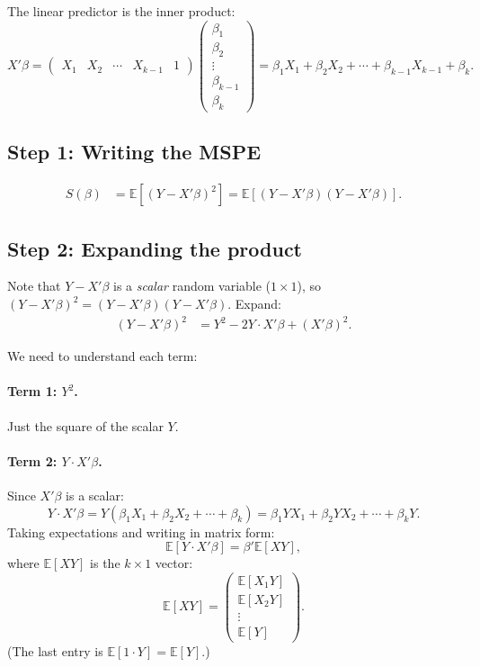 \documentclass[12pt]{article}
\newcommand{\E}{\mathbb{E}}
\theoremstyle{definition}
\begin{document}
The linear predictor is the inner product:
\[
X'\beta = \begin{pmatrix} X_1 & X_2 & \cdots & X_{k-1} & 1 \end{pmatrix}
\begin{pmatrix} \beta_1 \\ \beta_2 \\ \vdots \\ \beta_{k-1} \\ \beta_k \end{pmatrix}
= \beta_1 X_1 + \beta_2 X_2 + \cdots + \beta_{k-1} X_{k-1} + \beta_k.
\]

\subsection{Step 1: Writing the MSPE}

\begin{align}
S(\beta) &= \E\!\left[(Y - X'\beta)^2\right] = \E\!\left[(Y - X'\beta)(Y - X'\beta)\right]. \label{eq:Sbeta}
\end{align}

\subsection{Step 2: Expanding the product}

Note that $Y - X'\beta$ is a \emph{scalar} random variable ($1 \times 1$), so $(Y - X'\beta)^2 = (Y - X'\beta)(Y - X'\beta)$. Expand:
\begin{align*}
(Y - X'\beta)^2 &= Y^2 - 2Y \cdot X'\beta + (X'\beta)^2.
\end{align*}

We need to understand each term:

\paragraph{Term 1: $Y^2$.} Just the square of the scalar $Y$.

\paragraph{Term 2: $Y \cdot X'\beta$.} Since $X'\beta$ is a scalar:
\[
Y \cdot X'\beta = Y(\beta_1 X_1 + \beta_2 X_2 + \cdots + \beta_k) = \beta_1 YX_1 + \beta_2 YX_2 + \cdots + \beta_k Y.
\]
Taking expectations and writing in matrix form:
\[
\E[Y \cdot X'\beta] = \beta' \E[XY],
\]
where $\E[XY]$ is the $k \times 1$ vector:
\[
\E[XY] = \begin{pmatrix} \E[X_1 Y] \\ \E[X_2 Y] \\ \vdots \\ \E[Y] \end{pmatrix}.
\]
(The last entry is $\E[1 \cdot Y] = \E[Y]$.)
\end{document}
